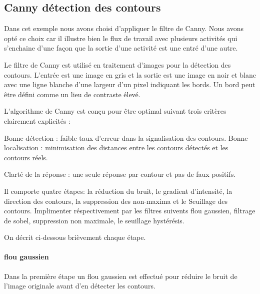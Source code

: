 \subsection{ Canny détection des contours } 


Dans cet exemple nous avons choisi d'appliquer le filtre de Canny. Nous avons opté ce choix car il illustre bien le flux de travail avec plusieurs activités qui s'enchaine d'une façon que la sortie d'une activité est une entré d'une autre.

Le filtre de Canny est utilisé en traitement d'images pour la détection des contours. L'entrée est une image en gris et la sortie est une image en noir et blanc avec une ligne blanche d'une largeur d'un pixel indiquant les bords. Un bord peut être défini comme un lieu de contraste élevé. 


L'algorithme de Canny est conçu pour être optimal suivant trois critères clairement explicités :

Bonne détection : faible taux d'erreur dans la signalisation des contours. Bonne localisation : minimisation des distances entre les contours détectés et les contours réels.

Clarté de la réponse : une seule réponse par contour et pas de faux positifs.%

Il comporte quatre étapes: la réduction du bruit, le gradient d'intensité, la direction des contours, la suppression des non-maxima et le Seuillage des contours. Implimenter réspectivement par les filtres suivents flou gaussien, filtrage de sobel, suppression non maximale, le seuillage hystérésis.



On décrit ci-dessous brièvement chaque étape.


\paragraph{flou gaussien }


Dans la première étape un flou gaussien est effectué pour réduire le bruit de l'image originale avant d'en détecter les contours. %


